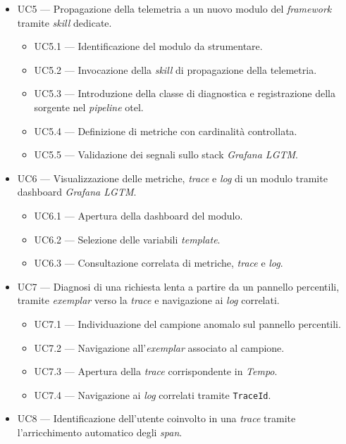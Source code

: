 \begin{itemize}
\begin{itemize}
          \item UC4.4 --- Gestione dei test falliti (estensione).
        \end{itemize}
  \item UC5 --- Propagazione della telemetria a un nuovo modulo del \emph{framework} tramite \emph{skill} dedicate.
        \begin{itemize}
          \item UC5.1 --- Identificazione del modulo da strumentare.
          \item UC5.2 --- Invocazione della \emph{skill} di propagazione della telemetria.
          \item UC5.3 --- Introduzione della classe di diagnostica e registrazione della sorgente nel \emph{pipeline} \gls{otel}.
          \item UC5.4 --- Definizione di metriche con cardinalità controllata.
          \item UC5.5 --- Validazione dei segnali sullo stack \emph{Grafana LGTM}.
        \end{itemize}
  \item UC6 --- Visualizzazione delle metriche, \emph{trace} e \emph{log} di un modulo tramite dashboard \emph{Grafana LGTM}.
        \begin{itemize}
          \item UC6.1 --- Apertura della dashboard del modulo.
          \item UC6.2 --- Selezione delle variabili \emph{template}.
          \item UC6.3 --- Consultazione correlata di metriche, \emph{trace} e \emph{log}.
        \end{itemize}
  \item UC7 --- Diagnosi di una richiesta lenta a partire da un pannello percentili, tramite \emph{exemplar} verso la \emph{trace} e navigazione ai \emph{log} correlati.
        \begin{itemize}
          \item UC7.1 --- Individuazione del campione anomalo sul pannello percentili.
          \item UC7.2 --- Navigazione all'\emph{exemplar} associato al campione.
          \item UC7.3 --- Apertura della \emph{trace} corrispondente in \emph{Tempo}.
          \item UC7.4 --- Navigazione ai \emph{log} correlati tramite \texttt{TraceId}.
        \end{itemize}
  \item UC8 --- Identificazione dell'utente coinvolto in una \emph{trace} tramite l'arricchimento automatico degli \emph{span}.

\end{itemize}
